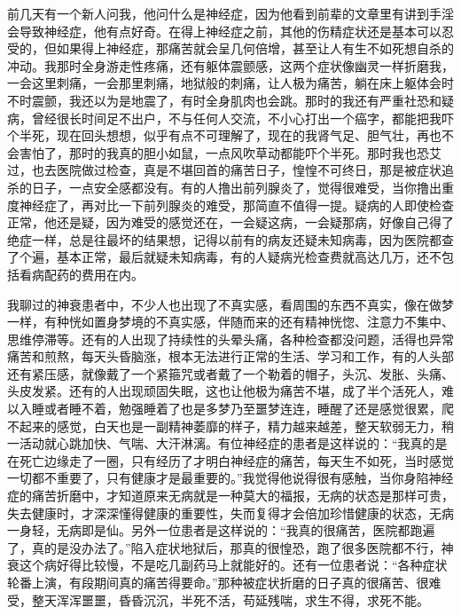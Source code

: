 前几天有一个新人问我，他问什么是神经症，因为他看到前辈的文章里有讲到手淫会导致神经症，他有点好奇。在得上神经症之前，其他的伤精症状还是基本可以忍受的，但如果得上神经症，那痛苦就会呈几何倍增，甚至让人有生不如死想自杀的冲动。我那时全身游走性疼痛，还有躯体震颤感，这两个症状像幽灵一样折磨我，一会这里刺痛，一会那里刺痛，地狱般的刺痛，让人极为痛苦，躺在床上躯体会时不时震颤，我还以为是地震了，有时全身肌肉也会跳。那时的我还有严重社恐和疑病，曾经很长时间足不出户，不与任何人交流，不小心打出一个癌字，都能把我吓个半死，现在回头想想，似乎有点不可理解了，现在的我肾气足、胆气壮，再也不会害怕了，那时的我真的胆小如鼠，一点风吹草动都能吓个半死。那时我也恐艾过，也去医院做过检查，真是不堪回首的痛苦日子，惶惶不可终日，那是被症状追杀的日子，一点安全感都没有。有的人撸出前列腺炎了，觉得很难受，当你撸出重度神经症了，再对比一下前列腺炎的难受，那简直不值得一提。疑病的人即使检查正常，他还是疑，因为难受的感觉还在，一会疑这病，一会疑那病，好像自己得了绝症一样，总是往最坏的结果想，记得以前有的病友还疑未知病毒，因为医院都查了个遍，基本正常，最后就疑未知病毒，有的人疑病光检查费就高达几万，还不包括看病配药的费用在内。

我聊过的神衰患者中，不少人也出现了不真实感，看周围的东西不真实，像在做梦一样，有种恍如置身梦境的不真实感，伴随而来的还有精神恍惚、注意力不集中、思维停滞等。还有的人出现了持续性的头晕头痛，各种检查都没问题，活得也异常痛苦和煎熬，每天头昏脑涨，根本无法进行正常的生活、学习和工作，有的人头部还有紧压感，就像戴了一个紧箍咒或者戴了一个勒着的帽子，头沉、发胀、头痛、头皮发紧。还有的人出现顽固失眠，这也让他极为痛苦不堪，成了半个活死人，难以入睡或者睡不着，勉强睡着了也是多梦乃至噩梦连连，睡醒了还是感觉很累，爬不起来的感觉，白天也是一副精神萎靡的样子，精力越来越差，整天软弱无力，稍一活动就心跳加快、气喘、大汗淋漓。有位神经症的患者是这样说的：“我真的是在死亡边缘走了一圈，只有经历了才明白神经症的痛苦，每天生不如死，当时感觉一切都不重要了，只有健康才是最重要的。”我觉得他说得很有感触，当你身陷神经症的痛苦折磨中，才知道原来无病就是一种莫大的福报，无病的状态是那样可贵，失去健康时，才深深懂得健康的重要性，失而复得才会倍加珍惜健康的状态，无病一身轻，无病即是仙。另外一位患者是这样说的：“我真的很痛苦，医院都跑遍了，真的是没办法了。”陷入症状地狱后，那真的很惶恐，跑了很多医院都不行，神衰这个病好得比较慢，不是吃几副药马上就能好的。还有一位患者说：“各种症状轮番上演，有段期间真的痛苦得要命。”那种被症状折磨的日子真的很痛苦、很难受，整天浑浑噩噩，昏昏沉沉，半死不活，苟延残喘，求生不得，求死不能。

